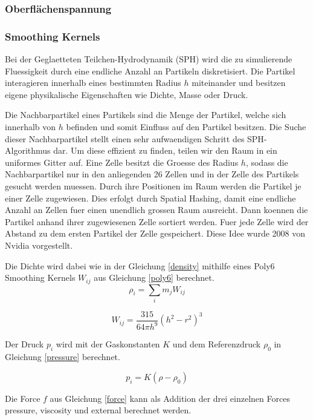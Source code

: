 \documentclass[a4paper]{paper}
\begin{document}
\subsubsection{Oberflächenspannung}
\subsubsection{Smoothing Kernels}
Bei der Geglaetteten Teilchen-Hydrodynamik (SPH) wird die zu simulierende Fluessigkeit durch eine endliche Anzahl an Partikeln diskretisiert. Die Partikel interagieren innerhalb eines bestimmten Radius $h$ miteinander und besitzen eigene physikalische Eigenschaften wie  Dichte, Masse oder Druck.

Die Nachbarpartikel eines Partikels sind die Menge der Partikel, welche sich innerhalb von $h$ befinden und somit Einfluss auf den Partikel besitzen. Die Suche dieser Nachbarpartikel stellt einen sehr aufwaendigen Schritt des SPH-Algorithmus dar. Um diese effizient zu finden, teilen wir den Raum in ein uniformes Gitter auf. Eine Zelle besitzt die Groesse des Radius $h$, sodass die Nachbarpartikel nur in den anliegenden 26 Zellen und in der Zelle des Partikels gesucht werden muessen. Durch ihre Positionen im Raum werden die Partikel je einer Zelle zugewiesen. Dies erfolgt durch Spatial Hashing, damit eine endliche Anzahl an Zellen fuer einen unendlich grossen Raum ausreicht. Dann koennen die Partikel anhand ihrer zugewiesenen Zelle sortiert werden. Fuer jede Zelle wird der Abstand zu dem ersten Partikel der Zelle gespeichert. Diese Idee wurde 2008 von Nvidia vorgestellt. \cite{Nvidia}

Die Dichte wird dabei wie in der Gleichung \ref{density} mithilfe eines Poly6 Smoothing Kernels $W_{ij}$ aus Gleichung \ref{poly6} berechnet.
\begin{equation}
\label{density}
\rho_i = \sum_i{m_j W_{ij}}
\end{equation}

\begin{equation}
\label{poly6}
W_{ij} = \frac{315}{64 \pi h^9} (h^2-r^2)^3
\end{equation}

Der Druck $p_i$ wird mit der Gaskonstanten $K$ und dem Referenzdruck $\rho_0$ in Gleichung \ref{pressure} berechnet.

\begin{equation}
\label{pressure}
p_i=K(\rho-\rho_0)
\end{equation}

Die Force $f$ aus Gleichung \ref{force} kann als Addition der drei einzelnen Forces pressure, viscosity und external berechnet werden.
\end{document}
